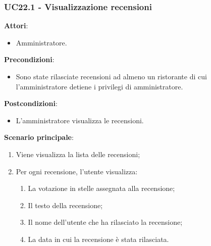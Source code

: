 \newpage
\subsubsection{UC22.1 - Visualizzazione recensioni}\label{usecase:22_1}
\textbf{Attori}:
\begin{itemize}
    \item Amministratore.
\end{itemize}
\textbf{Precondizioni}:
\begin{itemize}
    \item Sono state rilasciate recensioni ad almeno un ristorante di cui l'amministratore detiene i privilegi di amministratore.
\end{itemize}
\textbf{Postcondizioni}:
\begin{itemize}
    \item L'amministratore visualizza le recensioni.
\end{itemize}
\textbf{Scenario principale}:
\begin{enumerate}
    \item Viene visualizza la lista delle recensioni;
    \item Per ogni recensione, l'utente visualizza:
    \begin{enumerate}
        \item La votazione in stelle assegnata alla recensione;
        \item Il testo della recensione;
        \item Il nome dell'utente che ha rilasciato la recensione;
        \item La data in cui la recensione è stata rilasciata.
    \end{enumerate}
\end{enumerate}